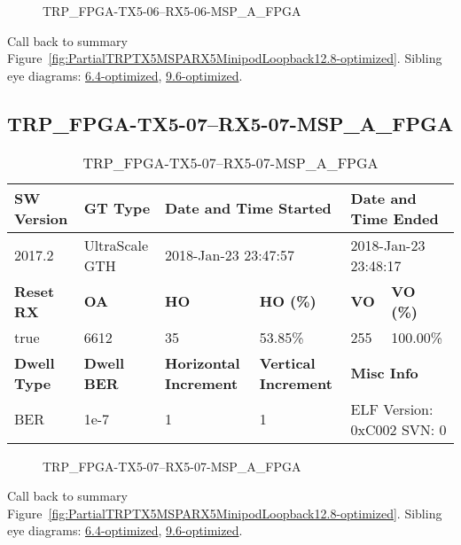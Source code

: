 \begin{figure}[h]
\caption{TRP\_FPGA-TX5-06--RX5-06-MSP\_A\_FPGA} \label{fig:TRPFPGATX506RX506MSPAFPGA12.8-optimized}
\end{figure}

Call back to summary Figure~\ref{fig:PartialTRPTX5MSPARX5MinipodLoopback12.8-optimized}.
Sibling eye diagrams: \hyperref[sec:TRPFPGATX506RX506MSPAFPGA6.4-optimized]{6.4-optimized}, \hyperref[sec:TRPFPGATX506RX506MSPAFPGA9.6-optimized]{9.6-optimized}.

\clearpage
\newpage


\subsection{TRP\_FPGA-TX5-07--RX5-07-MSP\_A\_FPGA}\label{sec:TRPFPGATX507RX507MSPAFPGA12.8-optimized}

\begin{table}[h]
\centering
\caption{TRP\_FPGA-TX5-07--RX5-07-MSP\_A\_FPGA}
\label{tab:TRPFPGATX507RX507MSPAFPGA12.8-optimized}
\begin{tabular}{@{}|l|l|l|l|l|l|@{}}
\toprule
\textbf{SW Version}                & \textbf{GT Type}   & \multicolumn{2}{l|}{\textbf{Date and Time Started}}            & \multicolumn{2}{l|}{\textbf{Date and Time Ended}}        \\ \midrule
2017.2                       & UltraScale GTH          & \multicolumn{2}{l|}{2018-Jan-23 23:47:57}                   & \multicolumn{2}{l|}{2018-Jan-23 23:48:17}               \\ \midrule
\textbf{Reset RX}                  & \textbf{OA} & \textbf{HO}   & \textbf{HO (\%)} & \textbf{VO} & \textbf{VO (\%)} \\ \midrule
true & 6612        & 35          & 53.85\%        & 255        & 100.00\%       \\ \midrule
\textbf{Dwell Type}                & \textbf{Dwell BER} & \textbf{Horizontal Increment} & \textbf{Vertical Increment}    & \multicolumn{2}{l|}{\textbf{Misc Info}}                  \\ \midrule
BER                            & 1e-7        & 1        & 1           & \multicolumn{2}{l|}{ELF Version: 0xC002 SVN: 0}                         \\ \bottomrule
\end{tabular}
\end{table}

\begin{figure}[h]
\caption{TRP\_FPGA-TX5-07--RX5-07-MSP\_A\_FPGA} \label{fig:TRPFPGATX507RX507MSPAFPGA12.8-optimized}
\end{figure}

Call back to summary Figure~\ref{fig:PartialTRPTX5MSPARX5MinipodLoopback12.8-optimized}.
Sibling eye diagrams: \hyperref[sec:TRPFPGATX507RX507MSPAFPGA6.4-optimized]{6.4-optimized}, \hyperref[sec:TRPFPGATX507RX507MSPAFPGA9.6-optimized]{9.6-optimized}.

\clearpage
\newpage

